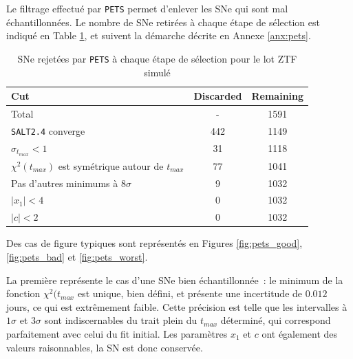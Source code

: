 \documentclass{book}
\def\pets{\texttt{PETS}\xspace}
\def\saltd{\texttt{SALT2.4}\xspace}
\begin{document}
Le filtrage effectué par \pets permet d'enlever les SNe qui sont mal échantillonnées. Le nombre de SNe retirées à chaque étape de sélection est indiqué en Table \ref{tab:pets}, et suivent la démarche décrite en Annexe \ref{anx:pets}.

\begin{table}
    \centering
    \begin{tabular}{p{7cm}|c|c}
         Cut & Discarded & Remaining\\
         \hline
         Total & - & 1591\\
         \saltd converge & 442 & 1149\\
         $\sigma_{t_{max}}<1$ & 31 & 1118\\
         $\chi^2(t_{max})$ est symétrique autour de $t_{max}$ & 77 & 1041\\
         Pas d'autres minimums à $8\sigma$ & 9 & 1032\\
	$|x_1|<4$ & 0 & 1032\\
	$|c|<2$ & 0  & 1032
    \end{tabular}
    \caption{SNe rejetées par \pets à chaque étape de sélection pour le lot ZTF simulé}
    \label{tab:pets}
\end{table}

 Des cas de figure typiques sont représentés en Figures \ref{fig:pets_good}, \ref{fig:pets_bad} et \ref{fig:pets_worst}.
 
La première représente le cas d'une SNe bien échantillonnée~: le minimum de la fonction $\chi^2(t_{max}$ est unique, bien défini, et présente une incertitude de $0.012$ jours, ce qui est extrêmement faible. Cette précision est telle que les intervalles à $1\sigma$ et $3\sigma$ sont indiscernables du trait plein du $t_{max}$ déterminé, qui correspond parfaitement avec celui du fit initial. Les paramètres $x_1$ et $c$ ont également des valeurs raisonnables, la SN est donc conservée.
\end{document}
